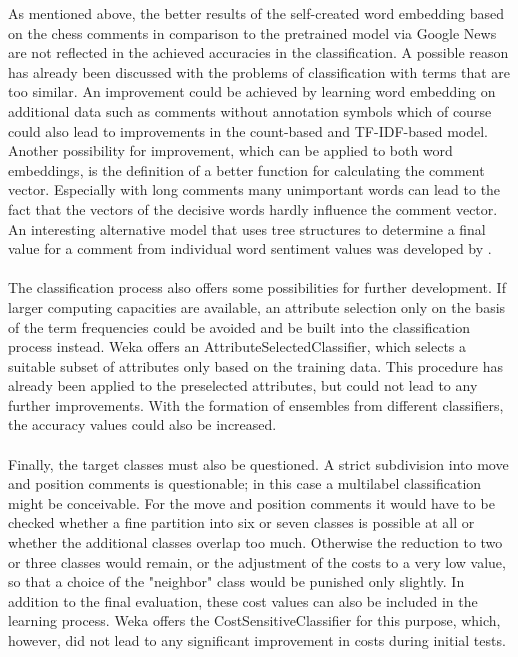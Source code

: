 \documentclass[article,type=msc,colorback,accentcolor=tud7b]{tudthesis}
\begin{document}
    As mentioned above, the better results of the self-created word embedding based on the chess comments in comparison to the pretrained model via Google News are not reflected in the achieved accuracies in the classification. A possible reason has already been discussed with the problems of classification with terms that are too similar. An improvement could be achieved by learning word embedding on additional data such as comments without annotation symbols which of course could also lead to improvements in the count-based and TF-IDF-based model. Another possibility for improvement, which can be applied to both word embeddings, is the definition of a better function for calculating the comment vector. Especially with long comments many unimportant words can lead to the fact that the vectors of the decisive words hardly influence the comment vector. An interesting alternative model that uses tree structures to determine a final value for a comment from individual word sentiment values was developed by \citeauthor{Socher2013} \autocite{Socher2013}. \\\\
    The classification process also offers some possibilities for further development. If larger computing capacities are available, an attribute selection only on the basis of the term frequencies could be avoided and be built into the classification process instead. Weka offers an AttributeSelectedClassifier, which selects a suitable subset of attributes only based on the training data. This procedure has already been applied to the preselected attributes, but could not lead to any further improvements. With the formation of ensembles from different classifiers, the accuracy values could also be increased. \\\\
    Finally, the target classes must also be questioned. A strict subdivision into move and position comments is questionable; in this case a multilabel classification might be conceivable. For the move and position comments it would have to be checked whether a fine partition into six or seven classes is possible at all or whether the additional classes overlap too much. Otherwise the reduction to two or three classes would remain, or the adjustment of the costs to a very low value, so that a choice of the "neighbor" class would be punished only slightly. In addition to the final evaluation, these cost values can also be included in the learning process. Weka offers the CostSensitiveClassifier for this purpose, which, however, did not lead to any significant improvement in costs during initial tests.

  \clearpage
  
  \printbibliography
  \clearpage
  
\end{document}
